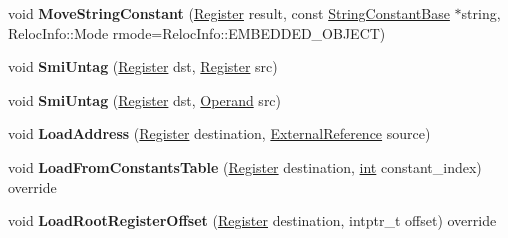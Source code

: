 \begin{DoxyCompactItemize}
\item 
\mbox{\label{classv8_1_1internal_1_1TurboAssembler_a151077e69be0bab09818a3420ee9ab08}} 
void {\bfseries Move\+String\+Constant} (\mbox{\hyperlink{classv8_1_1internal_1_1Register}{Register}} result, const \mbox{\hyperlink{classv8_1_1internal_1_1StringConstantBase}{String\+Constant\+Base}} $\ast$string, Reloc\+Info\+::\+Mode rmode=Reloc\+Info\+::\+E\+M\+B\+E\+D\+D\+E\+D\+\_\+\+O\+B\+J\+E\+CT)
\item 
\mbox{\label{classv8_1_1internal_1_1TurboAssembler_a662e721293e21b26a146af007a839080}} 
void {\bfseries Smi\+Untag} (\mbox{\hyperlink{classv8_1_1internal_1_1Register}{Register}} dst, \mbox{\hyperlink{classv8_1_1internal_1_1Register}{Register}} src)
\item 
\mbox{\label{classv8_1_1internal_1_1TurboAssembler_a849b65553d28a7f10d7d5e2652c2c4e9}} 
void {\bfseries Smi\+Untag} (\mbox{\hyperlink{classv8_1_1internal_1_1Register}{Register}} dst, \mbox{\hyperlink{classv8_1_1internal_1_1Operand}{Operand}} src)
\item 
\mbox{\label{classv8_1_1internal_1_1TurboAssembler_a3ad77e343976506ca4be04cd3552f27a}} 
void {\bfseries Load\+Address} (\mbox{\hyperlink{classv8_1_1internal_1_1Register}{Register}} destination, \mbox{\hyperlink{classv8_1_1internal_1_1ExternalReference}{External\+Reference}} source)
\item 
\mbox{\label{classv8_1_1internal_1_1TurboAssembler_a6c8fae865ac1fd7f79f9d4934a46392a}} 
void {\bfseries Load\+From\+Constants\+Table} (\mbox{\hyperlink{classv8_1_1internal_1_1Register}{Register}} destination, \mbox{\hyperlink{classint}{int}} constant\+\_\+index) override
\item 
\mbox{\label{classv8_1_1internal_1_1TurboAssembler_a20588856c39f30350ccd570332e761ea}} 
void {\bfseries Load\+Root\+Register\+Offset} (\mbox{\hyperlink{classv8_1_1internal_1_1Register}{Register}} destination, intptr\+\_\+t offset) override
\item 
\mbox{\label{classv8_1_1internal_1_1TurboAssembler_a77e9d10255bc9a25985ff71df883e665}} 

\end{DoxyCompactItemize}
